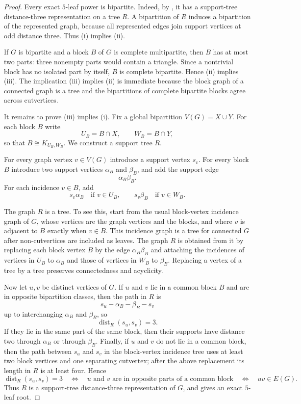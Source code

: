 \documentclass[11pt]{article}
\theoremstyle{definition}
\newcommand{\dist}{\operatorname{dist}}
\begin{document}
\begin{proof}
Every exact $5$-leaf power is bipartite.  Indeed, by , it has a support-tree distance-three representation on a tree $R$.  A bipartition of $R$ induces a bipartition of the represented graph, because all represented edges join support vertices at odd distance three.  Thus (i) implies (ii).

If $G$ is bipartite and a block $B$ of $G$ is complete multipartite, then $B$ has at most two parts: three nonempty parts would contain a triangle.  Since a nontrivial block has no isolated part by itself, $B$ is complete bipartite.  Hence (ii) implies (iii).  The implication (iii) implies (ii) is immediate because the block graph of a connected graph is a tree and the bipartitions of complete bipartite blocks agree across cutvertices.

It remains to prove (iii) implies (i).  Fix a global bipartition $V(G)=X\cup Y$.  For each block $B$ write
\[
 U_B=B\cap X,\qquad W_B=B\cap Y,
\]
so that $B\cong K_{U_B,W_B}$.  We construct a support tree $R$.

For every graph vertex $v\in V(G)$ introduce a support vertex $s_v$.  For every block $B$ introduce two support vertices $\alpha_B$ and $\beta_B$, and add the support edge
\[
 \alpha_B\beta_B.
\]
For each incidence $v\in B$, add
\[
 s_v\alpha_B \quad\text{if } v\in U_B,
 \qquad
 s_v\beta_B \quad\text{if } v\in W_B.
\]

The graph $R$ is a tree.  To see this, start from the usual block-vertex incidence graph of $G$, whose vertices are the graph vertices and the blocks, and where $v$ is adjacent to $B$ exactly when $v\in B$.  This incidence graph is a tree for connected $G$ after non-cutvertices are included as leaves.  The graph $R$ is obtained from it by replacing each block vertex $B$ by the edge $\alpha_B\beta_B$ and attaching the incidences of vertices in $U_B$ to $\alpha_B$ and those of vertices in $W_B$ to $\beta_B$.  Replacing a vertex of a tree by a tree preserves connectedness and acyclicity.

Now let $u,v$ be distinct vertices of $G$.  If $u$ and $v$ lie in a common block $B$ and are in opposite bipartition classes, then the path in $R$ is
\[
 s_u-\alpha_B-\beta_B-s_v
\]
up to interchanging $\alpha_B$ and $\beta_B$, so
\[
 \dist_R(s_u,s_v)=3.
\]
If they lie in the same part of the same block, then their supports have distance two through $\alpha_B$ or through $\beta_B$.  Finally, if $u$ and $v$ do not lie in a common block, then the path between $s_u$ and $s_v$ in the block-vertex incidence tree uses at least two block vertices and one separating cutvertex; after the above replacement its length in $R$ is at least four.  Hence
\[
 \dist_R(s_u,s_v)=3
 \quad\Longleftrightarrow\quad
 u\text{ and }v\text{ are in opposite parts of a common block}
 \quad\Longleftrightarrow\quad
 uv\in E(G).
\]
Thus $R$ is a support-tree distance-three representation of $G$, and  gives an exact $5$-leaf root.
\end{proof}
\end{document}
